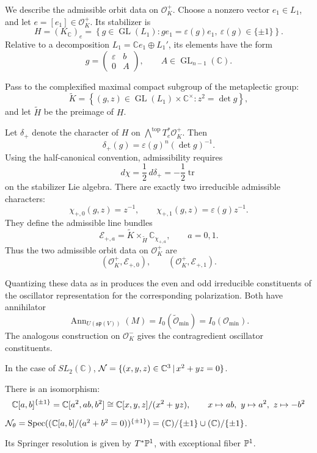 We describe the admissible orbit data on $\mathcal O_K^+$.
Choose a nonzero vector $e_1\in L_1$, and let
$e=[e_1]\in\mathcal O_K^+$. Its stabilizer is
\[
  H=(K_{\mathbb C})_e
  =\left\{
    g\in\operatorname{GL}(L_1):
    ge_1=\varepsilon(g)e_1,\ 
    \varepsilon(g)\in\{\pm1\}
  \right\}.
\]
Relative to a decomposition $L_1=\mathbb C e_1\oplus L_1'$, its elements
have the form
\[
  g=
  \begin{pmatrix}
    \varepsilon & b\\
    0 & A
  \end{pmatrix},
  \qquad
  A\in\operatorname{GL}_{n-1}(\mathbb C).
\]

Pass to the complexified maximal compact subgroup of the metaplectic
group:
\[
  \widetilde K
  =\left\{
    (g,z)\in\operatorname{GL}(L_1)\times\mathbb C^\times:
    z^2=\det g
  \right\},
\]
and let $\widetilde H$ be the preimage of $H$.

Let $\delta_+$ denote the character of $H$ on
$\bigwedge^{\mathrm{top}}T_e^*\mathcal O_K^+$. Then
\[
  \delta_+(g)=\varepsilon(g)^n(\det g)^{-1}.
\]
Using the half-canonical convention, admissibility requires
\[
  d\chi=\frac12\,d\delta_+
  =-\frac12\operatorname{tr}
\]
on the stabilizer Lie algebra. There are exactly two irreducible
admissible characters:
\[
  \chi_{+,0}(g,z)=z^{-1},
  \qquad
  \chi_{+,1}(g,z)=\varepsilon(g)z^{-1}.
\]
They define the admissible line bundles
\[
  \mathcal E_{+,a}
  =\widetilde K\times_{\widetilde H}\mathbb C_{\chi_{+,a}},
  \qquad a=0,1.
\]
Thus the two admissible orbit data on $\mathcal O_K^+$ are
\[
  (\mathcal O_K^+,\mathcal E_{+,0}),
  \qquad
  (\mathcal O_K^+,\mathcal E_{+,1}).
\]

Quantizing these data as in \cite{LY25} produces the even and odd irreducible
constituents of the oscillator representation for the corresponding
polarization. Both have annihilator
\[
  \operatorname{Ann}_{U(\mathfrak{sp}(V))}(M)
  =I_0(\widetilde{\mathcal O}_{\min})
  =I_0(\mathcal O_{\min}).
\]
The analogous construction on $\mathcal O_K^-$ gives the contragredient oscillator constituents.


\begin{rk}
  In the case of $SL_2(\mathbb C)$, $\mathcal{N} = \{(x,y,z) \in \mathbb{C}^3\,|\,x^2 + yz = 0\}$.

  There is an isomorphism:
  \[
    \mathbb{C}[a,b]^{ \{\pm1\}} = \mathbb{C}[a^2, ab, b^2] \cong \mathbb{C}[x,y,z]/(x^2 + yz),
    \qquad
    x \mapsto ab, \ y \mapsto a^2, \ z \mapsto -b^2
  \]
  $\mathcal{N}_{\theta} = \operatorname{Spec}((\mathbb{C}[a,b]/(a^2+b^2 = 0))^{ \{\pm1\}}) = (\mathbb{C})/{\{\pm1\}} \cup (\mathbb{C})/{\{\pm1\}}$.

  Its Springer resolution is given by $T^*\mathbb{P}^1$, with exceptional fiber $\mathbb{P}^1$.
\end{rk}


